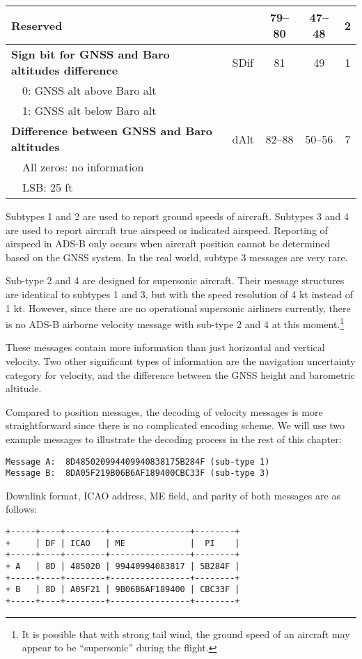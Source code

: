 \begin{table}[ht]
\begin{tabular}{|l|l|c|c|c|}
\textbf{Reserved} &  & 79--80 & 47--48 & 2 \\ \hline
\textbf{Sign bit for GNSS and Baro altitudes difference} & SDif & 81 & 49 & 1\\
~~0: GNSS alt above Baro alt &&&& \\
~~1: GNSS alt below Baro alt &&&& \\ \hline
\textbf{Difference between GNSS and Baro altitudes} & dAlt & 82--88 & 50--56 & 7\\
~~All zeros: no information &&&&\\
~~LSB: 25 ft &&&& \\ \hline
\end{tabular}
\end{table}

Subtypes 1 and 2 are used to report ground speeds of aircraft. Subtypes 3 and 4 are used to report aircraft true airspeed or indicated airspeed. Reporting of airspeed in ADS-B only occurs when aircraft position cannot be determined based on the GNSS system. In the real world, subtype 3 messages are very rare. 

Sub-type 2 and 4 are designed for supersonic aircraft. Their message structures are identical to subtypes 1 and 3, but with the speed resolution of 4 kt instead of 1 kt. However, since there are no operational supersonic airliners currently, there is no ADS-B airborne velocity message with sub-type 2 and 4 at this moment.\footnote{It is possible that with strong tail wind, the ground speed of an aircraft may appear to be ``supersonic'' during the flight.}

These messages contain more information than just horizontal and vertical velocity. Two other significant types of information are the navigation uncertainty category for velocity, and the difference between the GNSS height and barometric altitude. 

Compared to position messages, the decoding of velocity messages is more straightforward since there is no complicated encoding scheme. We will use two example messages to illustrate the decoding process in the rest of this chapter:

\begin{verbatim}
Message A:  8D485020994409940838175B284F (sub-type 1)
Message B:  8DA05F219B06B6AF189400CBC33F (sub-type 3)
\end{verbatim}

Downlink format, ICAO address, ME field, and parity of both messages are as follows:

\begin{verbatim}
+-----+----+--------+----------------+--------+
+     | DF | ICAO   | ME             |  PI    |
+-----+----+--------+----------------+--------+
+ A   | 8D | 485020 | 99440994083817 | 5B284F |
+-----+----+--------+----------------+--------+
+ B   | 8D | A05F21 | 9B06B6AF189400 | CBC33F |
+-----+----+--------+----------------+--------+
\end{verbatim}

